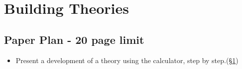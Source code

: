\section{Building Theories}\label{sec:Theorising}

\subsection*{Paper Plan - 20 page limit}

\begin{itemize}
  \item
     Present a development of a theory using the calculator,
     step by step.(\S\ref{sec:Theorising})
\end{itemize}
